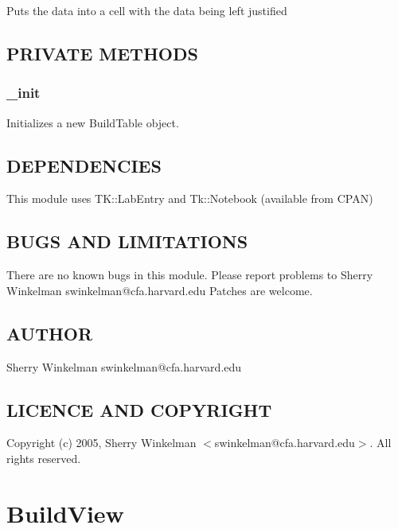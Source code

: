 \documentclass{article}
\begin{document}
Puts the data into a cell with the data being left justified

\subsection*{PRIVATE METHODS\label{BuildTable_PRIVATE_METHODS}}
\subsubsection*{\_init\label{BuildTable__init}}


Initializes a new BuildTable object.

\subsection*{DEPENDENCIES\label{BuildTable_DEPENDENCIES}}


This module uses TK::LabEntry and Tk::Notebook (available from CPAN)

\subsection*{BUGS AND LIMITATIONS\label{BuildTable_BUGS_AND_LIMITATIONS}}


There are no known bugs in this module.
Please report problems to Sherry Winkelman swinkelman@cfa.harvard.edu
Patches are welcome.

\subsection*{AUTHOR\label{BuildTable_AUTHOR}}


Sherry Winkelman swinkelman@cfa.harvard.edu

\subsection*{LICENCE AND COPYRIGHT\label{BuildTable_LICENCE_AND_COPYRIGHT}}


Copyright (c) 2005, Sherry Winkelman $<$swinkelman@cfa.harvard.edu$>$. All rights 
reserved.

\clearpage
\section{BuildView\label{BuildView}}
\end{document}
